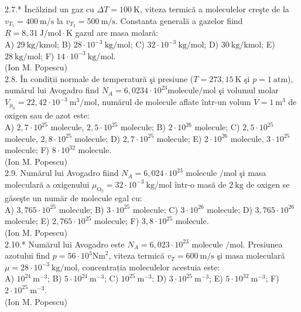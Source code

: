 2.7.* Încălzind un gaz cu $\Delta T=100 \mathrm{~K}$, viteza termică a moleculelor creşte de la $v_{T_{1}}=400 \mathrm{~m} / \mathrm{s}$ la $v_{T_{2}}=500 \mathrm{~m} / \mathrm{s}$. Constanta generală a gazelor fiind $R=8,31 \mathrm{~J} / \mathrm{mol} \cdot \mathrm{K}$ gazul are masa molară:\\ A) $29 \mathrm{~kg} / \mathrm{kmol}$; B) $28 \cdot 10^{-3} \mathrm{~kg} / \mathrm{mol}$; C) $32 \cdot 10^{-3} \mathrm{~kg} / \mathrm{mol}$; D) $30 \mathrm{~kg} / \mathrm{kmol}$; E) $28 \mathrm{~kg} / \mathrm{mol}$; F) $14 \cdot 10^{-3} \mathrm{~kg} / \mathrm{mol}$.\\ (Ion M. Popescu)\\

2.8. În condiții normale de temperatură şi presiune ($T=273,15 \mathrm{~K}$ şi $p=1 \mathrm{~atm}$), numărul lui Avogadro find $N_{A}=6,0234 \cdot 10^{23} \mathrm{molecule} / \mathrm{mol}$ şi volumul molar $V_{\mu_{0}}=22,42 \cdot 10^{-3} \mathrm{~m}^{3} / \mathrm{mol}$, numărul de molecule aflate într-un volum $V=1 \mathrm{~m}^{3}$ de oxigen sau de azot este:\\ A) $2,7 \cdot 10^{25}$ molecule, $2,5 \cdot 10^{25}$ molecule; B) $2 \cdot 10^{26}$ molecule; C) $2,5 \cdot 10^{25}$ molecule, $2,8 \cdot 10^{25}$ molecule; D) $2,7 \cdot 10^{25}$ molecule; E) $2 \cdot 10^{26}$ molecule, $3 \cdot 10^{25}$ molecule; F) $8 \cdot 10^{32}$ molecule.\\ (Ion M. Popescu)\\

2.9. Numărul lui Avogadro fiind $N_{A}=6,024 \cdot 10^{23}$ molecule $/ \mathrm{mol}$ şi masa moleculară a oxigenului $\mu_{\mathrm{O}_{2}}=32 \cdot 10^{-3} \mathrm{~kg} / \mathrm{mol}$ într-o masă de $2 \mathrm{~kg}$ de oxigen se găseşte un număr de molecule egal cu:\\ A) $3,765 \cdot 10^{25}$ molecule; B) $3 \cdot 10^{25}$ molecule; C) $3 \cdot 10^{26}$ molecule; D) $3,765 \cdot 10^{26}$ molecule; E) $2,765 \cdot 10^{25}$ molecule; F) $3,8 \cdot 10^{25}$ molecule.\\ (Ion M. Popescu)\\

2.10.* Numărul lui Avogadro este $N_{A}=6,023 \cdot 10^{23}$ molecule $/ \mathrm{mol}$. Presiunea azotului find $p=56 \cdot 10^{3} \mathrm{Nm}^{2}$, viteza termică $v_{T}=600 \mathrm{~m} / \mathrm{s}$ şi masa moleculară $\mu=28 \cdot 10^{-3} \mathrm{~kg} / \mathrm{mol}$, concentrația moleculelor acestuia este:\\ A) $10^{24} \mathrm{~m}^{-3}$; B) $5 \cdot 10^{24} \mathrm{~m}^{-3}$; C) $10^{25} \mathrm{~m}^{-3}$; D) $3 \cdot 10^{25} \mathrm{~m}^{-3}$; E) $5 \cdot 10^{32} \mathrm{~m}^{-3}$; F) $2 \cdot 10^{25} \mathrm{~m}^{-3}$.\\ (Ion M. Popescu)\\

